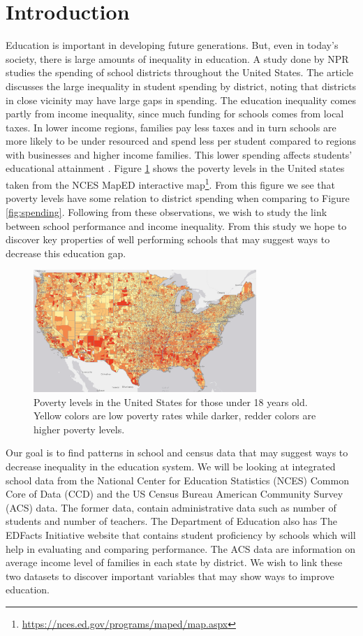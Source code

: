 \section{Introduction} \label{sec:intro}
Education is important in developing future generations. But, even in today's society, there is large amounts of inequality in education. A study done by NPR \cite{npr2016} studies the spending of school districts throughout the United States. The article discusses the large inequality in student spending by district, noting that districts in close vicinity may have large gaps in spending. The education inequality comes partly from income inequality, since much funding for schools comes from local taxes. In lower income regions, families pay less taxes and in turn schools are more likely to be under resourced and spend less per student compared to regions with businesses and higher income families. This lower spending affects students' educational attainment \cite{spending2015, spending2017}. Figure \ref{fig:poverty} shows the poverty levels in the United states taken from the NCES MapED interactive map\footnote{\href{https://nces.ed.gov/programs/maped/map.aspx}{https://nces.ed.gov/programs/maped/map.aspx}}. From this figure we see that poverty levels have some relation to district spending when comparing to Figure \ref{fig:spending}. Following from these observations, we wish to study the link between school performance and income inequality. From this study we hope to discover key properties of well performing schools that may suggest ways to decrease this education gap. 

\begin{figure} 
	\includegraphics[width=8.45cm]{images/poverty_us.png}
	\caption{Poverty levels in the United States for those under 18 years old. Yellow colors are low poverty rates while darker, redder colors are higher poverty levels.}
	\label{fig:poverty}
\end{figure}

Our goal is to find patterns in school and census data that may suggest ways to decrease inequality in the education system. We will be looking at integrated school data from the National Center for Education Statistics (NCES) Common Core of Data (CCD) and the US Census Bureau American Community Survey (ACS) data. The former data, contain administrative data such as number of students and number of teachers. The Department of Education also has The EDFacts Initiative website that contains student proficiency by schools which will help in evaluating and comparing performance. The ACS data are information on average income level of families in each state by district. We wish to link these two datasets to discover important variables that may show ways to improve education.

